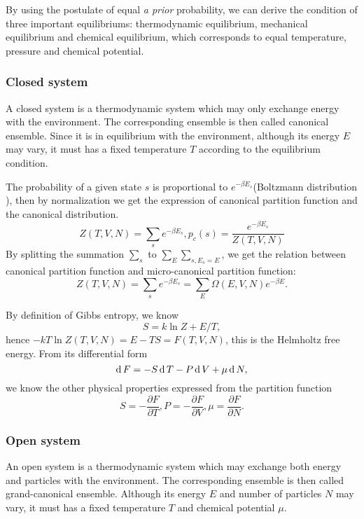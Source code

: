 By using the postulate of equal \textit{a prior} probability, we can derive the condition of three important equilibriums: thermodynamic equilibrium, mechanical equilibrium and chemical equilibrium, which corresponds to equal temperature, pressure and chemical potential.

\subsubsection{Closed system}
A closed system is a thermodynamic system which may only exchange energy with the environment. The corresponding ensemble is then called canonical ensemble. Since it is in equilibrium with the environment, although its energy $E$ may vary, it must has a fixed temperature $T$ according to the equilibrium condition.

The probability of a given state $s$ is proportional to $e^{-\beta E_s}$(Boltzmann distribution ), then by normalization we get the expression of canonical partition function and the canonical distribution.
\begin{equation}
	Z(T,V,N)=\sum_se^{-\beta E_s}, p_c(s) = \frac{e^{-\beta E_s}}{Z(T,V,N)}
\end{equation}
By splitting the summation $\sum_s$ to $\sum_E\sum_{s, E_s=E}$, we get the relation between canonical partition function and micro-canonical partition function:
\begin{equation}
	Z(T,V,N) = \sum_s e^{-\beta E_s} =\sum_E \Omega(E,V,N)e^{-\beta E}.
\end{equation}

By definition of Gibbs entropy, we know
\begin{equation}
	S=k\ln Z + E/T,
\end{equation}
hence $-kT\ln Z(T,V,N) =E-TS= F(T,V,N)$, this is the Helmholtz free energy. From its differential form
\begin{equation}
	\operatorname{d}F = -S\operatorname{d}T-P\operatorname{d}V+\mu\operatorname{d}N,
\end{equation}
we know the other physical properties expressed from the partition function
\begin{equation}
	S=-\frac{\partial F}{\partial T}, P=-\frac{\partial F}{\partial V}, \mu = \frac{\partial F}{\partial N}.
\end{equation}

\subsubsection{Open system}
An open system is a thermodynamic system which may exchange both energy and particles with the environment. The corresponding ensemble is then called grand-canonical ensemble. Although its energy $E$ and number of particles $N$ may vary, it must has a fixed temperature $T$ and chemical potential $\mu$.

